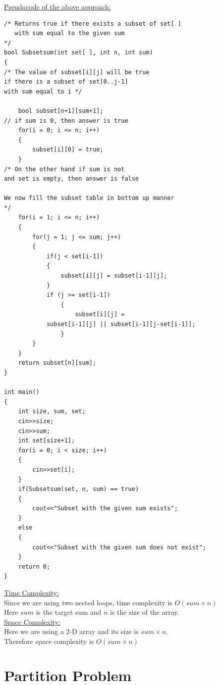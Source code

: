 \documentclass[12pt]{book}
\begin{document}
\underline{Pseudocode of the above approach:}\\

\begin{lstlisting}
/* Returns true if there exists a subset of set[ ]
   with sum equal to the given sum
*/
bool Subsetsum(int set[ ], int n, int sum)
{
/* The value of subset[i][j] will be true
if there is a subset of set[0..j-1] 
with sum equal to i */

    bool subset[n+1][sum+1];
// if sum is 0, then answer is true
    for(i = 0; i <= n; i++)
    {
        subset[i][0] = true;
    } 
/* On the other hand if sum is not
and set is empty, then answer is false

We now fill the subset table in bottom up manner
*/
    for(i = 1; i <= n; i++)
    {
        for(j = 1; j <= sum; j++)
        {
            if(j < set[i-1])
            {
                subset[i][j] = subset[i-1][j];
            }
            if (j >= set[i-1])
                {
                    subset[i][j] =
            subset[i-1][j] || subset[i-1][j-set[i-1]];
                }
        }
    }
    return subset[n][sum];
}

int main()
{	
    int size, sum, set;
    cin>>size;
    cin>>sum;
    int set[size+1];
    for(i = 0; i < size; i++)
    {
        cin>>set[i];
    }
    if(Subsetsum(set, n, sum) == true)
    {
        cout<<"Subset with the given sum exists";
    }
    else
    {
        cout<<"Subset with the given sum does not exist";
    }
    return 0;
}
\end{lstlisting}

\underline{Time Complexity:}\\
Since we are using two nested loops, time complexity is $O(sum \times n)$\\
Here $sum$ is the target sum and $n$ is the size of the array.\\

\underline{Space Complexity:}\\
Here we are using a 2-D array and its size is $sum \times n$.\\
Therefore space complexity is $O(sum \times n)$

\chapter{Partition Problem}
\end{document}

